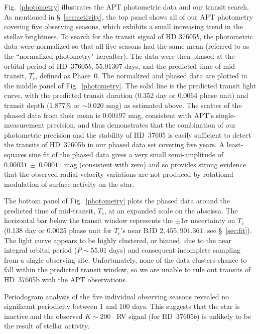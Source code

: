 Fig.~\ref{photometry} illustrates the APT photometric data and our
transit search. As mentioned in \S~\ref{sec:activity}, the top panel
shows all of our APT photometry covering five observing seasons, which
exhibits a small increasing trend in the stellar brightness.
%
To search for the transit signal of HD 37605$b$, the photometric data
were normalized so that all five seasons had the same mean
(referred to as the ``normalized photometry" hereafter). The data were
then phased at the orbital period of HD~37605$b$, $55.01307$ days, and
the predicted time of mid-transit, $T_c$, defined as Phase~0.  The
normalized and phased data are plotted in the middle panel of
Fig.~\ref{photometry}.  The solid line is the predicted transit light
curve, with the predicted transit duration (0.352 day or 0.0064 phase
unit) and transit depth (1.877\% or $\sim 0.020$ mag) as estimated
above. The scatter of the phased data from their mean is $0.00197$
mag, consistent with APT's single-measurement precision, and thus
demonstrates that the combination of our photometric precision and the
stability of HD~37605 is easily sufficient to detect the transits of
HD~37605b in our phased data set covering five years.  A least-squares
sine fit of the phased data gives a very small semi-amplitude of
$0.00031~\pm~0.00011$ mag (consistent with zero) and so provides
strong evidence that the observed radial-velocity variations are not
produced by rotational modulation of surface activity on the star.


The bottom panel of Fig.~\ref{photometry} plots the phased data around
the predicted time of mid-transit, $T_c$, at an expanded scale on the
abscissa.  The horizontal bar below the transit window represents the
$\pm$1$\sigma$ uncertainty on $T_c$ (0.138 day or 0.0025 phase unit for 
$T_c$'s near BJD $2,455,901.361$; see \S~\ref{sec:fit}).  The light curve 
appears to be highly clustered, or binned, due to the near integral orbital
period ($P \sim 55.01$ days) and consequent incomplete sampling from a 
single observing site.  Unfortunately, none of the data clusters chance 
to fall within the predicted transit window, so we are unable to rule out 
transits of HD~37605b with the APT observations.

Periodogram analysis of the five individual observing seasons revealed no
significant periodicity between 1 and 100 days.  This suggests that the star 
is inactive and the observed $K \sim 200$ \mps\ RV signal (for HD~37605$b$) 
is unlikely to be the result of stellar activity.

